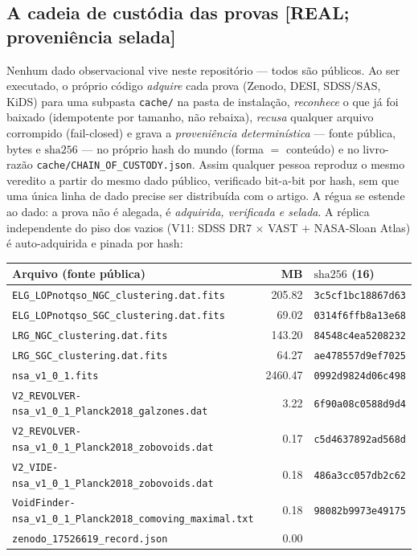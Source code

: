 \documentclass[11pt]{article}
\theoremstyle{definition}\newtheorem{deriv}{Derivação}
\begin{document}
\subsection*{A cadeia de custódia das provas \textsf{[REAL; proveniência selada]}}

Nenhum dado observacional vive neste repositório --- todos são públicos. Ao ser executado, o próprio código \emph{adquire} cada prova (Zenodo, DESI, SDSS/SAS, KiDS) para uma subpasta \texttt{cache/} na pasta de instalação, \emph{reconhece} o que já foi baixado (idempotente por tamanho, não rebaixa), \emph{recusa} qualquer arquivo corrompido (fail-closed) e grava a \emph{proveniência determinística} --- fonte pública, bytes e $\mathrm{sha}256$ --- no próprio hash do mundo (forma $=$ conteúdo) e no livro-razão \texttt{cache/CHAIN\_OF\_CUSTODY.json}. Assim qualquer pessoa reproduz o mesmo veredito a partir do mesmo dado público, verificado bit-a-bit por hash, sem que uma única linha de dado precise ser distribuída com o artigo. A régua se estende ao dado: a prova não é alegada, é \emph{adquirida, verificada e selada}. A réplica independente do piso dos vazios (V11: SDSS DR7 $\times$ VAST $+$ NASA-Sloan Atlas) é auto-adquirida e pinada por hash:

\begin{center}\footnotesize\begin{longtable}{@{}p{}rl@{}}\toprule Arquivo (fonte pública) & MB & $\mathrm{sha}256$ (16) \\ \midrule\endhead \texttt{ELG\_LOPnotqso\_NGC\_clustering.dat.fits} & 205.82 & \texttt{3c5cf1bc18867d63} \\  \texttt{ELG\_LOPnotqso\_SGC\_clustering.dat.fits} & 69.02 & \texttt{0314f6ffb8a13e68} \\  \texttt{LRG\_NGC\_clustering.dat.fits} & 143.20 & \texttt{84548c4ea5208232} \\  \texttt{LRG\_SGC\_clustering.dat.fits} & 64.27 & \texttt{ae478557d9ef7025} \\  \texttt{nsa\_v1\_0\_1.fits} & 2460.47 & \texttt{0992d9824d06c498} \\  \texttt{V2\_REVOLVER-nsa\_v1\_0\_1\_Planck2018\_galzones.dat} & 3.22 & \texttt{6f90a08c0588d9d4} \\  \texttt{V2\_REVOLVER-nsa\_v1\_0\_1\_Planck2018\_zobovoids.dat} & 0.17 & \texttt{c5d4637892ad568d} \\  \texttt{V2\_VIDE-nsa\_v1\_0\_1\_Planck2018\_zobovoids.dat} & 0.18 & \texttt{486a3cc057db2c62} \\  \texttt{VoidFinder-nsa\_v1\_0\_1\_Planck2018\_comoving\_maximal.txt} & 0.18 & \texttt{98082b9973e49175} \\  \texttt{zenodo\_17526619\_record.json} & 0.00 & \texttt{} \\ \bottomrule\end{longtable}\end{center}
\end{document}
